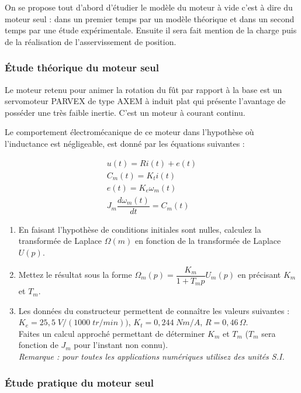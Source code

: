 On se propose tout d’abord d’étudier le modèle du moteur à vide c’est à dire du moteur seul : dans un premier temps par un modèle théorique et dans un second temps par une étude expérimentale. Ensuite il sera fait mention de la charge puis de la réalisation de l’asservissement de position.

\subsubsection{Étude théorique du moteur seul}

Le moteur retenu pour animer la rotation du fût par rapport à la base est un servomoteur PARVEX de type AXEM à induit plat qui présente l’avantage de posséder une très faible inertie. C’est un moteur à courant continu.

Le comportement électromécanique de ce moteur dans l’hypothèse où l’inductance est négligeable, est donné par les équations suivantes :

\begin{eqnarray*}
u(t)=Ri(t)+e(t) \\
C_m(t)=K_t i(t) \\
e(t)= K_e \omega_m(t) \\
J_m \dfrac{d\omega_m (t)}{dt} = C_m(t)
\end{eqnarray*}


\begin{enumerate}
\item En faisant l’hypothèse de conditions initiales sont nulles, calculez la transformée de Laplace $\Omega(m)$ en fonction de la transformée de Laplace $U(p)$.
\item Mettez le résultat sous la forme $\Omega_m(p)=\dfrac{K_m}{1+T_m p} U_m(p)$ en précisant $K_m$ et $T_m$.
\item Les données du constructeur permettent de connaître les valeurs suivantes : $K_e=25,5\; V/(1000\; tr/min))$, $K_t=0,244 \; Nm/A$, $R=0,46\, \Omega$.\\
Faites un calcul approché permettant de déterminer $K_m$ et $T_m$ ($T_m$  sera fonction de $J_m$  pour l’instant non connu).\\
\textit{Remarque : pour toutes les applications numériques utilisez des unités S.I.}
\end{enumerate}

\subsubsection{Étude pratique du moteur seul}

